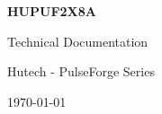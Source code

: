 \begin{titlepage}
    \pagecolor{titlepagecolor}
    \vspace*{\fill}
    \begin{center}
        {\Huge \textbf{HUPUF2X8A}}
        
        \vspace{1cm}
        
        {\Large Technical Documentation}
        
        \vspace{2cm}
        
        {\large Hutech - PulseForge Series}
        
        \vspace{0.5cm}
        
        {\large \today}
    \end{center}
    \vspace*{\fill}
\end{titlepage}
\newpage